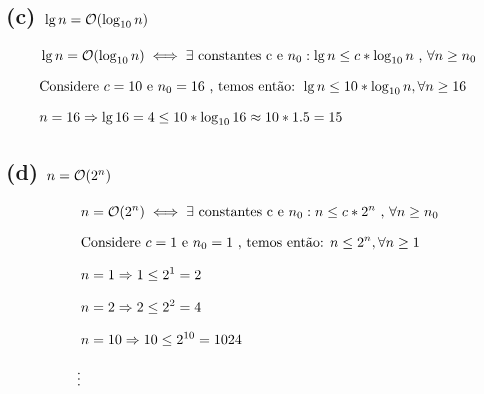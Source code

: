 
\subsection*{(c) $\lg n = \mathcal{O}(\log_{10} n)$}

\begin{equation*}
  \setlength{\jot}{10pt}
  \begin{aligned}
    &\lg n = \bigO(\log_{10} n) \iff \exists \text{ constantes c e $n_0$}: \lg n \leq c*\log_{10} n \text{ , } \forall n \geq n_0 \\
    &\text{Considere $c = 10$ e $n_0 = 16$ , temos então: } \lg n \leq 10*\log_{10} n, \forall n \geq 16 \\
    & n = 16 \Rightarrow \lg 16 = 4 \leq 10*\log_{10} 16 \approx 10*1.5 = 15 \\
\end{aligned}\end{equation*}


\subsection*{(d) $n = \mathcal{O}(2^{n})$}

\begin{equation*}
  \setlength{\jot}{10pt}
  \begin{aligned}
    &n = \bigO(2^{n}) \iff \exists \text{ constantes c e $n_0$}: n \leq c*2^{n} \text{ , } \forall n \geq n_0 \\
    &\text{Considere $c = 1$ e $n_0 = 1$ , temos então: } n \leq 2^{n}, \forall n \geq 1 \\
    & n = 1 \Rightarrow 1 \leq 2^{1} = 2 \\
    & n = 2 \Rightarrow 2 \leq 2^{2} = 4 \\
    & n = 10 \Rightarrow 10 \leq 2^{10} = 1024 \\
    \vdots
\end{aligned}\end{equation*}


